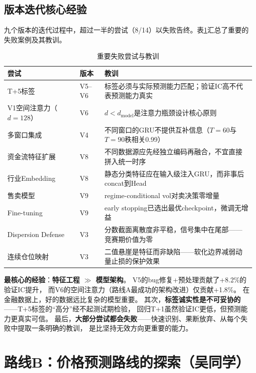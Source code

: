 \documentclass[12pt,a4paper]{ctexart}
\begin{document}
\subsection{版本迭代核心经验}

九个版本的迭代过程中，超过一半的尝试（8/14）以失败告终。表\ref{tab:failures}汇总了重要的失败案例及其教训。

\begin{table}[htbp]
\centering
\caption{重要失败尝试与教训}
\label{tab:failures}
\small
\begin{tabular}{llp{5cm}}
\toprule
尝试 & 版本 & 教训 \\
\midrule
T+5标签 & V5--V6 & 标签必须与实际预测能力匹配；验证IC高不代表预测能力真实 \\
V1空间注意力（$d{=}128$） & V6 & $d < d_{\text{model}}$是注意力瓶颈设计核心原则 \\
多窗口集成 & V4 & 不同窗口的GRU不提供互补信息（$T{=}60$与$T{=}90$秩相关0.99） \\
资金流特征扩展 & V8 & 不同数据源应先经独立编码再融合，不宜直接拼入统一时序 \\
行业Embedding & V8 & 静态分类特征应在输入级注入GRU，而非事后concat到Head \\
售卖模型 & V9 & regime-conditional vol对卖决策零增量 \\
Fine-tuning & V9 & early stopping已选出最优checkpoint，微调无增益 \\
Dispersion Defense & V3 & 分数截面离散度非平稳，信号集中在尾部——竞赛期价值为零 \\
连续仓位映射 & V3 & 二值悬崖是特征而非缺陷——软化边界减弱动量止损的保护效果 \\
\bottomrule
\end{tabular}
\end{table}

\textbf{最核心的经验}：\textbf{特征工程 $\gg$ 模型架构}。
V5的bug修复+预处理贡献了+8.2\%的验证IC提升，
而V6的空间注意力（路线A最成功的架构改进）仅贡献+1.8\%。
在金融数据上，好的数据远比复杂的模型重要。
其次，\textbf{标签诚实性是不可妥协的}——T+5标签的“高分”经不起测试期检验，
回归T+1虽然验证IC更低，但预测能力更真实可信。
最后，\textbf{大部分尝试都会失败}——快速识别、果断放弃、从每个失败中提取一条明确的教训，
是比坚持无效方向更重要的能力。

\section{路线B：价格预测路线的探索（吴同学）}
\end{document}
